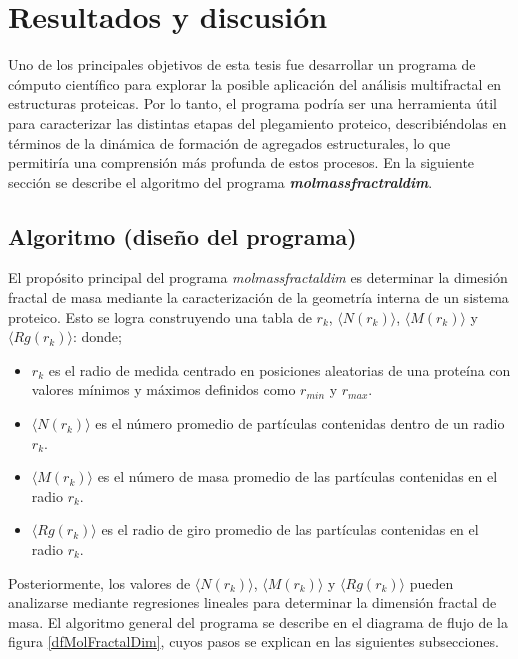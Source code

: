 \chapter{Resultados y discusi\'{o}n}

Uno de los principales objetivos de esta tesis fue desarrollar un programa de c\'{o}mputo cient\'{i}fico para explorar la posible aplicaci\'{o}n del an\'{a}lisis multifractal en estructuras proteicas. Por lo tanto, el programa podr\'{i}a ser una herramienta \'{u}til para caracterizar las distintas etapas del plegamiento proteico, describi\'{e}ndolas en t\'{e}rminos de la din\'{a}mica de formaci\'{o}n de agregados estructurales, lo que permitir\'{i}a una comprensi\'{o}n m\'{a}s profunda de estos procesos. En la siguiente secci\'{o}n se describe el algoritmo del programa \textit{\textbf{molmassfractraldim}}. 
 
 
\section{Algoritmo (diseño del programa)}

El prop\'{o}sito principal del programa \textit{molmassfractaldim} es determinar la dimesi\'{o}n fractal de masa mediante la caracterizaci\'{o}n de la geometr\'{i}a interna de un sistema proteico. Esto se logra construyendo una tabla de $r_{k}$, $\langle N(r_k) \rangle$, $\langle M(r_k) \rangle$ y $\langle Rg(r_k) \rangle$: donde;

\begin{itemize}
	\item $r_{k}$ es el radio de medida centrado en posiciones aleatorias de una prote\'{i}na con valores m\'{i}nimos y m\'{a}ximos definidos como $r_{min}$ y $r_{max}$.
	\item $\langle N(r_k) \rangle$ es el n\'{u}mero promedio de part\'{i}culas contenidas dentro de un radio $r_{k}$. 
	\item  $\langle M(r_k) \rangle$ es el n\'{u}mero de masa promedio de las part\'{i}culas contenidas en el radio $r_{k}$.
	\item  $\langle Rg(r_k) \rangle$ es el radio de giro promedio de las part\'{i}culas contenidas en el radio $r_{k}$.
\end{itemize}

Posteriormente, los valores de $\langle N(r_k) \rangle$, $\langle M(r_k) \rangle$ y $\langle Rg(r_k) \rangle$ pueden analizarse mediante regresiones lineales para determinar la dimensi\'{o}n fractal de masa. El algoritmo general del programa se describe en el diagrama de flujo de la figura \ref{dfMolFractalDim}, cuyos pasos se explican en las siguientes subsecciones.
 
